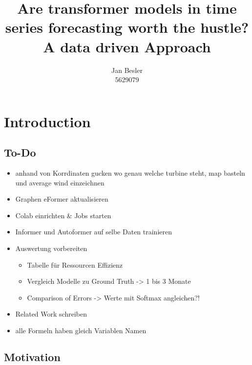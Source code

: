 \documentclass{article}
\title{Are transformer models in time series forecasting worth the hustle? \\
        \Large A data driven Approach}
\author{Jan Besler \\
        5629079}
\begin{document}
\maketitle

\tableofcontents

\lstlistoflistings

\newpage

\section{Introduction}

\subsection{To-Do}

\begin{itemize}
   \item anhand von Korrdinaten gucken wo genau welche turbine steht, map basteln und average wind einzeichnen
   \item Graphen eFormer aktualisieren
   \item Colab einrichten \& Jobs starten
   \item Informer und Autoformer auf selbe Daten trainieren
   \item Auswertung vorbereiten
   \begin{itemize}
       \item Tabelle für Ressourcen Effizienz
       \item Vergleich Modelle zu Ground Truth -> 1 bis 3 Monate
       \item Comparison of Errors -> Werte mit Softmax angleichen?!
   \end{itemize}
   \item Related Work schreiben
   \item alle Formeln haben gleich Variablen Namen
\end{itemize}

\subsection{Motivation}
\end{document}
